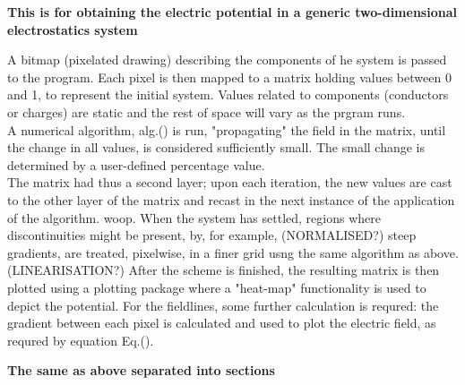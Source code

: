 \documentclass{article}
\begin{document}
  \noindent\textbf{This is for obtaining the electric potential in a generic two-dimensional electrostatics system}

  \vspace{5mm}

	A bitmap (pixelated drawing) describing the components of he system is passed to the program. Each pixel is then 
	 mapped to a matrix holding values between 0 and 1, to represent the initial system. Values related to components
	 (conductors or charges) are static and the rest of space will vary as the prgram runs.\\
	A numerical algorithm, alg.() is run, "propagating" the field in the matrix, until the change in all values, is 
	 considered sufficiently small. The small change is determined by a user-defined percentage value. \\
	The matrix had thus a second layer; upon each iteration, the new values are cast to the other layer of the 
	 matrix and recast in the next instance of the application of the algorithm. woop.
	When the system has settled, regions where discontinuities might be present, by, for example, (NORMALISED?)
	 steep gradients, are treated, pixelwise, in a finer grid usng the same algorithm as above. (LINEARISATION?)
	After the scheme is finished, the resulting matrix is then plotted using a plotting package where  a "heat-map" 
	 functionality is used to depict the potential. For the fieldlines, some further calculation is requred: the 
	 gradient between each pixel is calculated and used to plot the electric field, as requred by equation Eq.().

\vspace{7.5mm}

\noindent\textbf{The same as above separated into sections}

\vspace{5mm}
\end{document}

